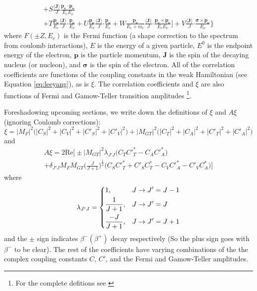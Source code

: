 \begin{multline}
    + S\frac{\langle \boldsymbol{J} \rangle}{J} \frac{\boldsymbol{p_e\cdot p_\nu}}{E_e E_\nu} \\
    + T\frac{\boldsymbol{p_e}}{E_e}\frac{\langle \boldsymbol{J} \rangle}{J} \boldsymbol{\cdot} \frac{\boldsymbol{p_\nu}}{E_\nu}
    + U\frac{\boldsymbol{p_\nu}}{E_\nu}\frac{\langle \boldsymbol{J} \rangle}{J} \boldsymbol{\cdot} \frac{\boldsymbol{p_e}}{E_e}
    + W\frac{\boldsymbol{p_e}}{E_e+m_e}\frac{\langle \boldsymbol{J} \rangle}{J} \boldsymbol{\cdot} \frac{\boldsymbol{p_e \times p_\nu}}{E_e E_\nu}
    \Bigg]
  + V\frac{\langle \boldsymbol{J} \rangle}{J} \boldsymbol{\cdot} \frac{\boldsymbol{\sigma \times p_\nu}}{E_\nu}
  \Bigg\}
  \label{eq:jackson}
\end{multline}
%
where $F(\pm Z, E_e)$ is the Fermi function (a shape correction to the spectrum
from coulomb interactions), $E$ is the energy of a given particle, $E^0$ is the endpoint
energy of the electron, $\boldsymbol{p}$ is the particle momentum, $\boldsymbol{J}$ is the spin of the
decaying nucleus (or nucleon), and $\boldsymbol{\sigma}$ is the spin of the electron. All of the correlation coefficients
are functions of the coupling constants in the weak Hamiltonian (see Equation \ref{eq:leeyang}),
as is $\xi$. The correlation coefficients and $\xi$ are also functions of Fermi and Gamow-Teller
transition amplitudes \footnote{For the complete defitions see \cite{jackson1957a,jackson1957b,ebel1957}}.

Foreshadowing upcoming sections, we write down the definitions of $\xi$ and $A\xi$ (ignoring Coulomb
corrections):
%
\begin{equation}
  \xi = |M_F|^2\big(|C_S|^2+|C_V|^2+|C'_S|^2+|C'_V|^2\big)+|M_{GT}|^2\big(|C_T|^2+|C_A|^2+|C'_T|^2+|C'_A|^2\big)
  \label{eq:xi}
\end{equation}
%
and
\begin{multline}
  A\xi = 2\mathrm{Re}\bigg[\pm |M_{GT}|^2 \lambda_{J'J}\big(C_TC'^*_T-C_AC'^*_A \big) \\
    + \delta_{J'J}M_FM_{GT}\bigg( \frac{J}{J+1} \bigg)^{\frac{1}{2}}\big(C_SC'^*_T+C'_SC^*_T -C_VC'^*_A-C'_VC^*_A \big) \bigg]
  \label{eq:XiA}
\end{multline}
where
\begin{equation}
\lambda_{J'J} =
\begin{dcases}
  1, & J\rightarrow J'=J-1 \\
  \frac{1}{J+1}, &  J\rightarrow J'=J \\
  \frac{-J}{J+1}, &  J\rightarrow J'=J+1 \\
\end{dcases}
\end{equation}
and the $\pm$ sign indicates $\beta^-(\beta^+)$ decay respectively (So the plus sign goes with
$\beta^-$ to be clear).
The rest of the coefficients have varying combinations of the the complex coupling
constants $C$, $C'$, and the Fermi and
Gamow-Teller amplitudes.

